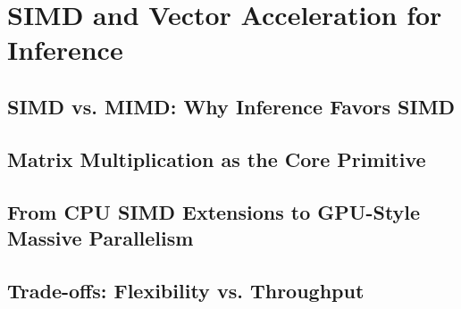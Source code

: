 \chapter{SIMD and Vector Acceleration for Inference}
\label{ch:simd}


\section{SIMD vs. MIMD: Why Inference Favors SIMD}

\section{Matrix Multiplication as the Core Primitive}

\section{From CPU SIMD Extensions to GPU-Style Massive Parallelism}

\section{Trade-offs: Flexibility vs. Throughput}
